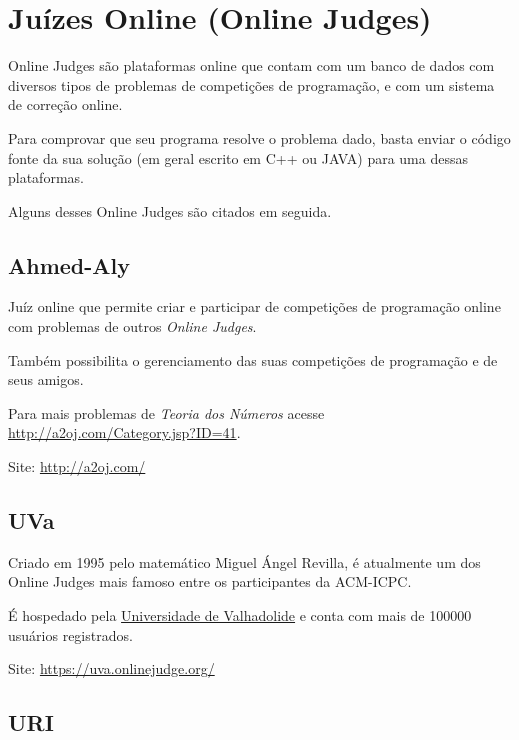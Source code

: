 
\chapter{Juízes Online (Online Judges)} %

\label{AppendixB} %

Online Judges são plataformas online que contam com um banco de dados com diversos tipos de problemas de competições de programação, e com um sistema de correção online.

Para comprovar que seu programa resolve o problema dado, basta enviar o código fonte da sua solução (em geral escrito em C++ ou JAVA) para uma dessas plataformas.

Alguns desses Online Judges são citados em seguida.


\section{Ahmed-Aly}

Juíz online que permite criar e participar de competições de programação online com problemas de outros \textit{Online Judges}.

Também possibilita o gerenciamento das suas competições de programação e de seus amigos.

Para mais problemas de \textit{Teoria dos Números} acesse \href{http://a2oj.com/Category.jsp?ID=41}{http://a2oj.com/Category.jsp?ID=41}.

Site: \href{http://a2oj.com/}{http://a2oj.com/}


\section{UVa} 
	
Criado em 1995 pelo matemático Miguel Ángel Revilla, é atualmente um dos Online Judges mais famoso entre os participantes da ACM-ICPC.

É hospedado pela \href{http://www.uva.es/export/sites/uva/}{Universidade de Valhadolide} e conta com mais de 100000 usuários registrados.

Site: \href{https://uva.onlinejudge.org/}{https://uva.onlinejudge.org/}


\section{URI}

